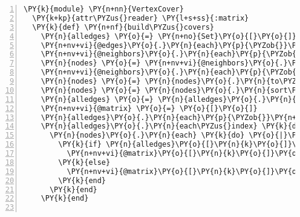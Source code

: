\begin{Verbatim}[commandchars=\\\{\},numbers=left,firstnumber=1,stepnumber=1,xleftmargin=7mm, fontsize=\small]
\PY{k}{module} \PY{n+nn}{VertexCover}
  \PY{k+kp}{attr\PYZus{}reader} \PY{l+s+ss}{:matrix}
  \PY{k}{def} \PY{n+nf}{build\PYZus{}covers}
    \PY{n}{alledges} \PY{o}{=} \PY{n+no}{Set}\PY{o}{[}\PY{o}{]}
    \PY{n+nv+vi}{@edges}\PY{o}{.}\PY{n}{each}\PY{p}{\PYZob{}}\PY{o}{|}\PY{n}{k}\PY{o}{|} \PY{n}{alledges}\PY{o}{.}\PY{n}{add}\PY{p}{(}\PY{n}{k}\PY{p}{)}\PY{p}{\PYZcb{}}
    \PY{n+nv+vi}{@neighbors}\PY{o}{.}\PY{n}{each}\PY{p}{\PYZob{}}\PY{o}{|}\PY{n}{k}\PY{o}{|} \PY{n}{k}\PY{o}{.}\PY{n}{edges}\PY{o}{.}\PY{n}{each}\PY{p}{\PYZob{}}\PY{o}{|}\PY{n}{j}\PY{o}{|} \PY{n}{alledges}\PY{o}{.}\PY{n}{add}\PY{p}{(}\PY{n}{j}\PY{p}{)}\PY{p}{\PYZcb{}}\PY{p}{\PYZcb{}}
    \PY{n}{nodes} \PY{o}{=} \PY{n+nv+vi}{@neighbors}\PY{o}{.}\PY{n}{to\PYZus{}set}\PY{o}{.}\PY{n}{add}\PY{p}{(}\PY{n+nb}{self}\PY{p}{)}
    \PY{n+nv+vi}{@neighbors}\PY{o}{.}\PY{n}{each}\PY{p}{\PYZob{}}\PY{o}{|}\PY{n}{k}\PY{o}{|} \PY{n}{k}\PY{o}{.}\PY{n}{neighbors}\PY{o}{.}\PY{n}{each}\PY{p}{\PYZob{}}\PY{o}{|}\PY{n}{j}\PY{o}{|} \PY{n}{nodes}\PY{o}{.}\PY{n}{add}\PY{p}{(}\PY{n}{j}\PY{p}{)}\PY{p}{\PYZcb{}}\PY{p}{\PYZcb{}}
    \PY{n}{nodes} \PY{o}{=} \PY{n}{nodes}\PY{o}{.}\PY{n}{to\PYZus{}a}
    \PY{n}{nodes} \PY{o}{=} \PY{n}{nodes}\PY{o}{.}\PY{n}{sort\PYZus{}by}\PY{p}{\PYZob{}}\PY{o}{|}\PY{n}{k}\PY{o}{|} \PY{n}{k}\PY{o}{.}\PY{n}{id}\PY{p}{\PYZcb{}}
    \PY{n}{alledges} \PY{o}{=} \PY{n}{alledges}\PY{o}{.}\PY{n}{to\PYZus{}a}
    \PY{n+nv+vi}{@matrix} \PY{o}{=} \PY{o}{[}\PY{o}{]}
    \PY{n}{alledges}\PY{o}{.}\PY{n}{each}\PY{p}{\PYZob{}}\PY{n+nv+vi}{@matrix}\PY{o}{.}\PY{n}{push}\PY{p}{(}\PY{o}{[}\PY{o}{]}\PY{p}{)}\PY{p}{\PYZcb{}}
    \PY{n}{alledges}\PY{o}{.}\PY{n}{each\PYZus{}index} \PY{k}{do} \PY{o}{|}\PY{n}{k}\PY{o}{|}
      \PY{n}{nodes}\PY{o}{.}\PY{n}{each} \PY{k}{do} \PY{o}{|}\PY{n}{j}\PY{o}{|}
        \PY{k}{if} \PY{n}{alledges}\PY{o}{[}\PY{n}{k}\PY{o}{]}\PY{o}{.}\PY{n}{include?}\PY{p}{(}\PY{n}{j}\PY{o}{.}\PY{n}{id}\PY{p}{)} \PY{k}{then}
          \PY{n+nv+vi}{@matrix}\PY{o}{[}\PY{n}{k}\PY{o}{]}\PY{o}{.}\PY{n}{push}\PY{p}{(}\PY{l+m+mi}{1}\PY{p}{)}
        \PY{k}{else}
          \PY{n+nv+vi}{@matrix}\PY{o}{[}\PY{n}{k}\PY{o}{]}\PY{o}{.}\PY{n}{push}\PY{p}{(}\PY{l+m+mi}{0}\PY{p}{)}
        \PY{k}{end}
      \PY{k}{end}
    \PY{k}{end}
    

\end{Verbatim}
